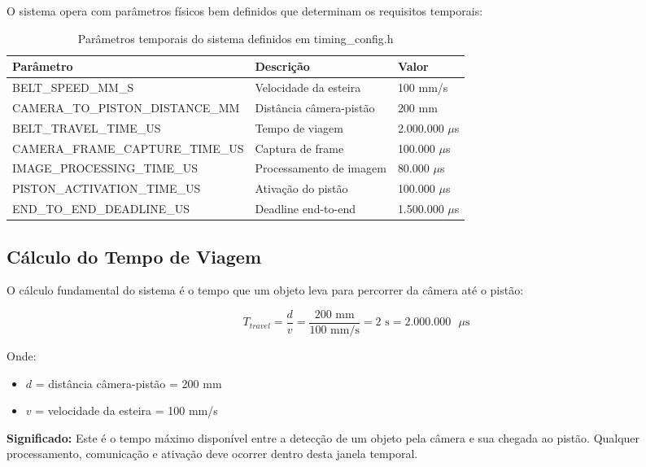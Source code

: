 \documentclass[12pt,a4paper]{article}
\begin{document}
O sistema opera com parâmetros físicos bem definidos que determinam os requisitos temporais:

\begin{table}[H]
\centering
\begin{tabularx}{\textwidth}{lXl}
\toprule
\textbf{Parâmetro} & \textbf{Descrição} & \textbf{Valor} \\
\midrule
BELT\_SPEED\_MM\_S & Velocidade da esteira & 100 mm/s \\
CAMERA\_TO\_PISTON\_DISTANCE\_MM & Distância câmera-pistão & 200 mm \\
BELT\_TRAVEL\_TIME\_US & Tempo de viagem & 2.000.000 $\mu$s \\
CAMERA\_FRAME\_CAPTURE\_TIME\_US & Captura de frame & 100.000 $\mu$s \\
IMAGE\_PROCESSING\_TIME\_US & Processamento de imagem & 80.000 $\mu$s \\
PISTON\_ACTIVATION\_TIME\_US & Ativação do pistão & 100.000 $\mu$s \\
END\_TO\_END\_DEADLINE\_US & Deadline end-to-end & 1.500.000 $\mu$s \\
\bottomrule
\end{tabularx}
\caption{Parâmetros temporais do sistema definidos em timing\_config.h}
\end{table}

\subsection{Cálculo do Tempo de Viagem}

O cálculo fundamental do sistema é o tempo que um objeto leva para percorrer da câmera até o pistão:

\begin{equation}
T_{travel} = \frac{d}{v} = \frac{200 \text{ mm}}{100 \text{ mm/s}} = 2 \text{ s} = 2.000.000 \text{ } \mu\text{s}
\end{equation}

Onde:
\begin{itemize}
    \item $d$ = distância câmera-pistão = 200 mm
    \item $v$ = velocidade da esteira = 100 mm/s
\end{itemize}

\textbf{Significado:} Este é o tempo máximo disponível entre a detecção de um objeto pela câmera e sua chegada ao pistão. Qualquer processamento, comunicação e ativação deve ocorrer dentro desta janela temporal.
\end{document}
